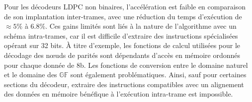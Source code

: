 \documentclass[../main.tex]{subfiles}
\begin{document}
Pour les décodeurs LDPC non binaires, l'accélération est faible en comparaison de son implantation inter-trames, avec une réduction du temps d'exécution de $\approx 5\%$ à $6.8\%$. 
Ces gains limités sont liés à la nature de l'algorithme avec un schéma intra-trames, car il est difficile d'extraire des instructions spécialisées opérant sur 32 bits. 
À titre d'exemple, les fonctions de calcul utilisées pour le décodage des nœuds de parités sont dépendants d'accès en mémoire ordonnés pour chaque donnée de 8b. 
Les fonctions de conversion entre le domaine naturel et le domaine des $\mathbb{GF}$ sont également problématiques. 
Ainsi, sauf pour certaines sections du décodeur, extraire des instructions compatibles avec un alignement des données en mémoire bénéfique à l'exécution intra-trame est impossible.
\end{document}
